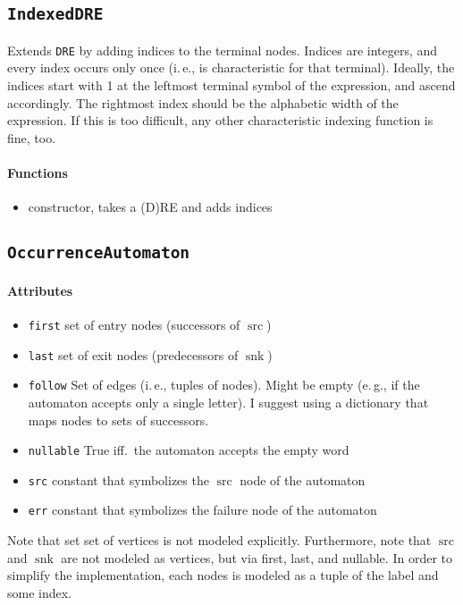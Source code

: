 \documentclass[a4paper,11pt, svgnames,titlepage]{article}
\DeclareMathOperator{\src}{src}
\DeclareMathOperator{\snk}{snk}
\begin{document}
\subsection{\texttt{IndexedDRE}}\label{sec:des:idre}
Extends \texttt{DRE} by adding indices to the terminal nodes. Indices are integers, and every index occurs only once (i.\,e., is characteristic for that terminal). Ideally, the indices start with 1 at the leftmost terminal symbol of the expression, and ascend accordingly. The rightmost index should be the alphabetic width of the expression. If this is too difficult, any other characteristic indexing function is fine, too.
\paragraph{Functions}
\begin{itemize}
	\item constructor, takes a (D)RE and adds indices
\end{itemize}

\subsection{\texttt{OccurrenceAutomaton}}\label{sec:des:oa}
\paragraph{Attributes}
\begin{itemize}
	\item\texttt{first} set of entry nodes (successors of $\src$)
	\item\texttt{last} set of exit nodes (predecessors of $\snk$)
	\item\texttt{follow} Set of edges (i.\,e., tuples of nodes). Might be empty (e.\,g., if the automaton accepts only a single letter). I suggest using a dictionary that maps nodes to sets of successors. 
	\item\texttt{nullable} True iff.\ the automaton accepts the empty word
	\item\texttt{src} constant that symbolizes the $\src$ node of the automaton
	\item\texttt{err} constant that symbolizes the failure node of the automaton	
\end{itemize}
Note that set set of vertices is not modeled explicitly. Furthermore, note that $\src$ and $\snk$ are not modeled as vertices, but via first, last, and nullable. In order to simplify the implementation, each nodes is modeled as a tuple of the label and some index.
\end{document}
